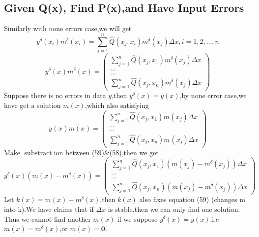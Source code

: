 \documentclass[a4paper]{article}
\newcommand{\tmmathbf}[1]{\ensuremath{\boldsymbol{#1}}}
\newcommand{\tmop}[1]{\ensuremath{\operatorname{#1}}}
\begin{document}
\subsection{Given Q(x), Find P(x),and Have Input Errors}

Similarly with none errors case,we will get
\begin{equation}
  y^{\delta} \left( x_i \right) m^{\delta} \left( x_i \right) = \sum^n_{j = 1}
  \hat{Q} \left( x_j, x_i \right) m^{\delta} \left( x_j \right) \Delta x, i =
  1, 2, \ldots, n
\end{equation}
\begin{equation}
  y^{\delta} \left( x_{} \right) m^{\delta} \left( x_{} \right) =
  \left(\begin{array}{c}
    \sum^n_{j = 1} \hat{Q} \left( x_j, x_1 \right) m^{\delta} \left( x_j
    \right) \Delta x\\
    \ldots\\
    \ldots\\
    \sum^n_{j = 1} \hat{Q} \left( x_j, x_n \right) m^{\delta} \left( x_j
    \right) \Delta x
  \end{array}\right)
\end{equation}
Suppose there is no errors in data $y$,then $y^{\delta} \left( x \right) = y
\left( x \right)$,by none error case,we have get a solution $m \left( x
\right)$,which also satisfying
\begin{equation}
  y^{} \left( x_{} \right) m \left( x_{} \right) = \left(\begin{array}{c}
    \sum^n_{j = 1} \hat{Q} \left( x_j, x_1 \right) m^{} \left( x_j \right)
    \Delta x\\
    \ldots\\
    \ldots\\
    \sum^n_{j = 1} \hat{Q} \left( x_j, x_n \right) m^{} \left( x_j \right)
    \Delta x
  \end{array}\right)
\end{equation}
Make $\tmop{substract}$ion between (59)\&(58),then we get
\begin{equation}
  y^{\delta} \left( x_{} \right) \left( m \left( x \right) - m^{\delta} \left(
  x \right) \right) = \left(\begin{array}{c}
    \sum^n_{j = 1} \hat{Q} \left( x_j, x_1 \right) \left( m \left( x_j \right)
    - m^{\delta} \left( x_j \right) \right) \Delta x\\
    \ldots\\
    \ldots\\
    \sum^n_{j = 1} \hat{Q} \left( x_j, x_n \right) \left( m \left( x_j \right)
    - m^{\delta} \left( x_j \right) \right) \Delta x
  \end{array}\right)
\end{equation}
Let $k \left( x \right) = m \left( x \right) - m^{\delta} \left( x
\right)$,then $k (x)$ also fixes equation (59) (changes m into k).We have
claims that if $\Delta x$ is stable,then we can only find one solution. Thus
we cannot find another $m (x)$ if we suppose $y^{\delta} \left( x \right) = y
\left( x \right)$.i.e $m \left( x \right) = m^{\delta} \left( x \right)$,or $m
\left( x \right) =\tmmathbf{0}$.
\end{document}
